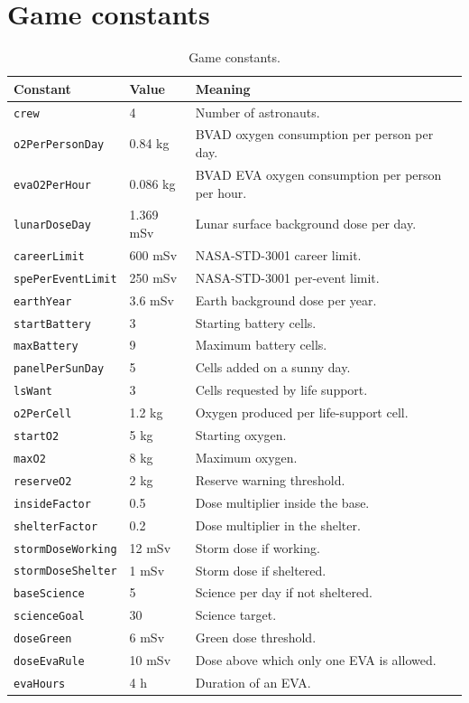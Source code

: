 \documentclass[11pt,a4paper]{article}
\newcommand{\code}[1]{\texttt{#1}}
\begin{document}
\appendix

\section{Game constants}

\begin{table}[H]
\centering
\small
\begin{tabular}{@{}p{4.2cm}p{2.4cm}p{8.2cm}@{}}
\toprule
\textbf{Constant} & \textbf{Value} & \textbf{Meaning}\\
\midrule
\code{crew} & 4 & Number of astronauts.\\
\code{o2PerPersonDay} & 0.84 kg & BVAD oxygen consumption per person per day.\\
\code{evaO2PerHour} & 0.086 kg & BVAD EVA oxygen consumption per person per hour.\\
\code{lunarDoseDay} & 1.369 mSv & Lunar surface background dose per day.\\
\code{careerLimit} & 600 mSv & NASA-STD-3001 career limit.\\
\code{spePerEventLimit} & 250 mSv & NASA-STD-3001 per-event limit.\\
\code{earthYear} & 3.6 mSv & Earth background dose per year.\\
\code{startBattery} & 3 & Starting battery cells.\\
\code{maxBattery} & 9 & Maximum battery cells.\\
\code{panelPerSunDay} & 5 & Cells added on a sunny day.\\
\code{lsWant} & 3 & Cells requested by life support.\\
\code{o2PerCell} & 1.2 kg & Oxygen produced per life-support cell.\\
\code{startO2} & 5 kg & Starting oxygen.\\
\code{maxO2} & 8 kg & Maximum oxygen.\\
\code{reserveO2} & 2 kg & Reserve warning threshold.\\
\code{insideFactor} & 0.5 & Dose multiplier inside the base.\\
\code{shelterFactor} & 0.2 & Dose multiplier in the shelter.\\
\code{stormDoseWorking} & 12 mSv & Storm dose if working.\\
\code{stormDoseShelter} & 1 mSv & Storm dose if sheltered.\\
\code{baseScience} & 5 & Science per day if not sheltered.\\
\code{scienceGoal} & 30 & Science target.\\
\code{doseGreen} & 6 mSv & Green dose threshold.\\
\code{doseEvaRule} & 10 mSv & Dose above which only one EVA is allowed.\\
\code{evaHours} & 4 h & Duration of an EVA.\\
\bottomrule
\end{tabular}
\caption{Game constants.}
\label{tab:constants}
\end{table}
\end{document}
